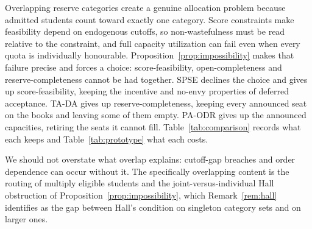 \documentclass[a4paper,twoside]{article}
\theoremstyle{definition}
\renewcommand{\T}{\mathcal{T}}
\begin{document}
Overlapping reserve categories create a genuine allocation problem because admitted students count toward exactly one category. Score constraints make feasibility depend on endogenous cutoffs, so non-wastefulness must be read relative to the constraint, and full capacity utilization can fail even when every quota is individually honourable. Proposition~\ref{prop:impossibility} makes that failure precise and forces a choice: score-feasibility, open-completeness and reserve-completeness cannot be had together. SPSE declines the choice and gives up score-feasibility, keeping the incentive and no-envy properties of deferred acceptance. TA-DA gives up reserve-completeness, keeping every announced seat on the books and leaving some of them empty. PA-ODR gives up the announced capacities, retiring the seats it cannot fill. Table~\ref{tab:comparison} records what each keeps and Table~\ref{tab:prototype} what each costs.

We should not overstate what overlap explains: cutoff-gap breaches and order dependence can occur without it. The specifically overlapping content is the routing of multiply eligible students and the joint-versus-individual Hall obstruction of Proposition~\ref{prop:impossibility}, which Remark~\ref{rem:hall} identifies as the gap between Hall's condition on singleton category sets and on larger ones.



\end{document}

